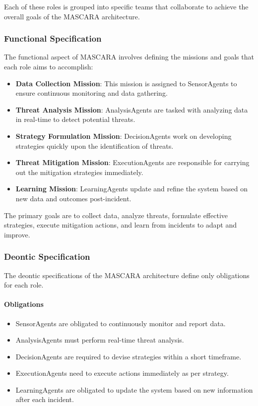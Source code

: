 \documentclass[conference]{IEEEtran}
\begin{document}
Each of these roles is grouped into specific teams that collaborate to achieve the overall goals of the MASCARA architecture.

\subsubsection*{Functional Specification}

The functional aspect of MASCARA involves defining the missions and goals that each role aims to accomplish:

\begin{itemize}
    \item \textbf{Data Collection Mission}: This mission is assigned to SensorAgents to ensure continuous monitoring and data gathering.
    \item \textbf{Threat Analysis Mission}: AnalysisAgents are tasked with analyzing data in real-time to detect potential threats.
    \item \textbf{Strategy Formulation Mission}: DecisionAgents work on developing strategies quickly upon the identification of threats.
    \item \textbf{Threat Mitigation Mission}: ExecutionAgents are responsible for carrying out the mitigation strategies immediately.
    \item \textbf{Learning Mission}: LearningAgents update and refine the system based on new data and outcomes post-incident.
\end{itemize}

The primary goals are to collect data, analyze threats, formulate effective strategies, execute mitigation actions, and learn from incidents to adapt and improve.

\subsubsection*{Deontic Specification}

The deontic specifications of the MASCARA architecture define only obligations for each role.

\paragraph*{Obligations}

\begin{itemize}
    \item SensorAgents are obligated to continuously monitor and report data.
    \item AnalysisAgents must perform real-time threat analysis.
    \item DecisionAgents are required to devise strategies within a short timeframe.
    \item ExecutionAgents need to execute actions immediately as per strategy.
    \item LearningAgents are obligated to update the system based on new information after each incident.
\end{itemize}
\end{document}
